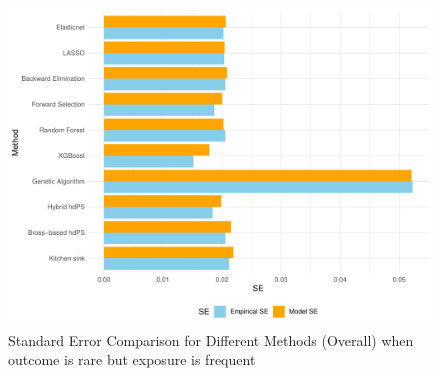 \documentclass[
  10pt,
]{article}
\begin{document}
\begin{figure}

{\centering \includegraphics[width=1\linewidth]{se_comparison_plotOR} 

}

\caption{Standard Error Comparison for Different Methods (Overall) when outcome is rare but exposure is frequent}\label{fig:unnamed-chunk-3}
\end{figure}

  
\end{document}
